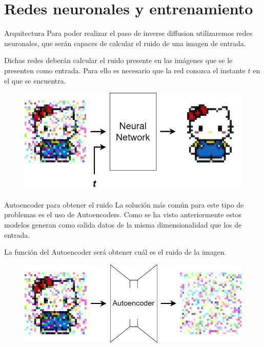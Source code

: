 \section{Redes neuronales y entrenamiento}

\begin{frame}{Arquitectura}
Para poder realizar el paso de \alert{inverse diffusion} utilizaremos redes neuronales, que serán capaces de calcular el \alert{ruido} de una imagen de entrada.

Dichas redes deberán calcular el \alert{ruido} presente en las imágenes que se le presenten como entrada. Para ello es necesario que la red conozca el instante \alert{$t$} en el que se encuentra.

\begin{figure}
    \centering
    \includegraphics[width=\textwidth]{Slides/figures/Diffusion_Models/Architecture.png}
\end{figure}
\end{frame}

\begin{frame}{Autoencoder para obtener el ruido}
La solución más común para este tipo de problemas es el uso de \alert{Autoencoders}. Como se ha visto anteriormente estos modelos generan como salida datos de la misma \alert{dimensionalidad} que los de entrada.

La función del Autoencoder será obtener cuál es el \alert{ruido} de la imagen.

\begin{figure}
    \centering
    \includegraphics[width=\textwidth]{Slides/figures/Diffusion_Models/Autoencoder_Denoising.png}
\end{figure}
\end{frame}

